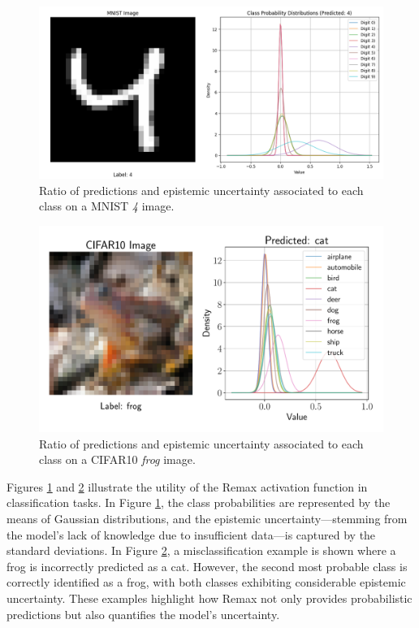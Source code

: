 \documentclass{article}
\begin{document}
\begin{figure}[h]
\centering
\includegraphics[width=1.0\linewidth]{Figures/4.png}
\caption{Ratio of predictions and epistemic uncertainty associated to each class on a MNIST \textit{4} image.}
\label{fig:remax_4}
\end{figure}


\begin{figure}[h]
\centering
\includegraphics[width=1.0\linewidth]{Figures/frog.pdf}
\caption{Ratio of predictions and epistemic uncertainty associated to each class on a CIFAR10 \textit{frog} image.}
\label{fig:remax_frog}
\end{figure}


Figures \ref{fig:remax_4} and \ref{fig:remax_frog} illustrate the utility of the Remax activation function in classification tasks. In Figure \ref{fig:remax_4}, the class probabilities are represented by the means of Gaussian distributions, and the epistemic uncertainty—stemming from the model’s lack of knowledge due to insufficient data—is captured by the standard deviations. In Figure \ref{fig:remax_frog}, a misclassification example is shown where a frog is incorrectly predicted as a cat. However, the second most probable class is correctly identified as a frog, with both classes exhibiting considerable epistemic uncertainty. These examples highlight how Remax not only provides probabilistic predictions but also quantifies the model’s uncertainty.
\end{document}
